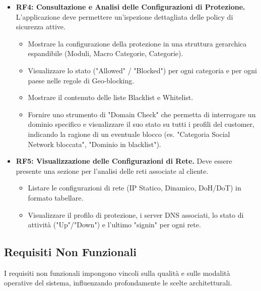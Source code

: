 \documentclass[12pt,a4paper,openright,twoside]{book}
\begin{document}
\begin{itemize}
    \item \textbf{RF4: Consultazione e Analisi delle Configurazioni di Protezione.} L'applicazione deve permettere un'ispezione dettagliata delle policy di sicurezza attive.
    \begin{itemize}
        \item Mostrare la configurazione della protezione in una struttura gerarchica espandibile (Moduli, Macro Categorie, Categorie).
        \item Visualizzare lo stato ("Allowed" / "Blocked") per ogni categoria e per ogni paese nelle regole di Geo-blocking.
        \item Mostrare il contenuto delle liste Blacklist e Whitelist.
        \item Fornire uno strumento di "Domain Check" che permetta di interrogare un dominio specifico e visualizzare il suo stato su tutti i profili del customer, indicando la ragione di un eventuale blocco (es. "Categoria Social Network bloccata", "Dominio in blacklist").
    \end{itemize}

    \item \textbf{RF5: Visualizzazione delle Configurazioni di Rete.} Deve essere presente una sezione per l'analisi delle reti associate al cliente.
    \begin{itemize}
        \item Listare le configurazioni di rete (IP Statico, Dinamico, DoH/DoT) in formato tabellare.
        \item Visualizzare il profilo di protezione, i server DNS associati, lo stato di attività ("Up"/"Down") e l'ultimo "signin" per ogni rete.
    \end{itemize}
\end{itemize}

\subsection{Requisiti Non Funzionali}
\label{subsec:req_non_funzionali}
I requisiti non funzionali impongono vincoli sulla qualità e sulle modalità operative del sistema, influenzando profondamente le scelte architetturali.
\end{document}
